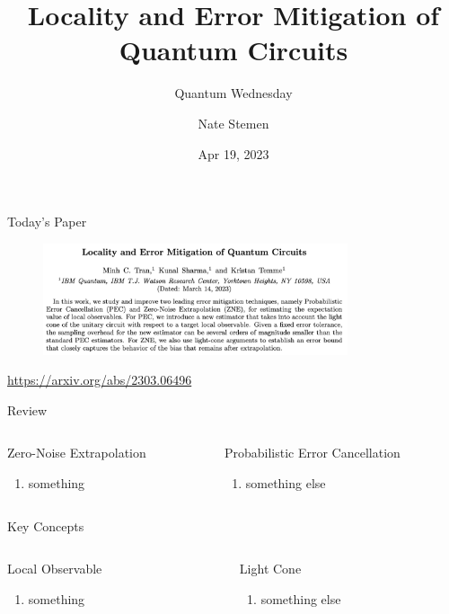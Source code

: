 \documentclass[11pt,aspectratio=1610,xcolor=dvipsnames]{beamer}
\title{Locality and Error Mitigation of Quantum Circuits}
\subtitle{Quantum Wednesday}
\date{Apr 19, 2023}
\author{Nate Stemen}
\begin{document}
\maketitle

\begin{frame}{Today's Paper}
	\begin{figure}[h]
		\centering
		\includegraphics[width=0.8\textwidth]{paper.png}
	\end{figure}
	\begin{center}
		\url{https://arxiv.org/abs/2303.06496}
	\end{center}
\end{frame}

\begin{frame}{Review}
	\begin{columns}
		\begin{column}{0.5\textwidth}
			{\Large Zero-Noise Extrapolation}
			\begin{enumerate}
				\item something
			\end{enumerate}
		\end{column}
		\begin{column}{0.5\textwidth}
			{\Large Probabilistic Error Cancellation}
			\begin{enumerate}
				\item something else
			\end{enumerate}
		\end{column}
	\end{columns}
\end{frame}

\begin{frame}{Key Concepts}
	\begin{columns}
		\begin{column}{0.5\textwidth}
			{\Large Local Observable}
			\begin{enumerate}
				\item something
			\end{enumerate}
		\end{column}
		\begin{column}{0.5\textwidth}
			{\Large Light Cone}
			\begin{enumerate}
				\item something else
			\end{enumerate}
		\end{column}
	\end{columns}
\end{frame}
\end{document}
